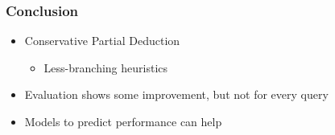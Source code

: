 \documentclass[xcolor=table]{beamer}
\begin{document}
\begin{frame}[fragile]
  \transwipe[direction=90]
  \frametitle{Conclusion}
  \begin{itemize}
    \item Conservative Partial Deduction
    \begin{itemize}
      \item Less-branching heuristics
    \end{itemize}
    \item Evaluation shows some improvement, but not for every query
    \item Models to predict performance can help
  \end{itemize}
\end{frame}













\end{document}
